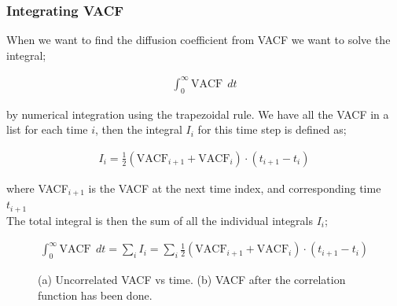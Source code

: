 \documentclass{article}
\begin{document}
\clearpage

\subsubsection{Integrating VACF}

When we want to find the diffusion coefficient from VACF we want
to solve the integral;

\begin{align}
    \int_0^\infty \mathrm{VACF} \ \ dt
\end{align}

by numerical integration using the trapezoidal rule.
We have all the VACF in a list for each time $i$, then the integral $I_i$
for this time step is defined as;

\begin{align}
    I_i = \frac{1}{2}(\mathrm{VACF}_{i+1} 
    + \mathrm{VACF}_i) \cdot (t_{i+1} - t_i)
\end{align}

where VACF$_{i+1}$ is the VACF at the next time index,
and corresponding time $t_{i+1}$\\

The total integral is then the sum of all the individual integrals $I_i$;

\begin{align}
    \int_0^\infty \mathrm{VACF} \ \ dt = \sum_i I_i = \sum_i \frac{1}{2}(\mathrm{VACF}_{i+1} 
    + \mathrm{VACF}_i) \cdot (t_{i+1} - t_i)
\end{align}



\begin{figure}[htb]
	\centering
  \caption{
    (a) Uncorrelated VACF vs time.
    (b) VACF after the correlation function has been done.
  }
\end{figure}
\end{document}
